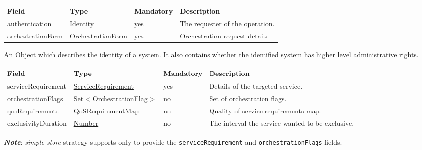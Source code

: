 \documentclass[a4paper]{arrowhead}
\newcommand{\pref}[1]{{\textcolor{ArrowheadGrey}{\hyperref[sec:model:primitives:#1]{#1}}}}
\begin{document}
{}
 
\begin{table}[ht!]
\begin{tabularx}{\textwidth}{| p{3.25cm} | p{3.5cm} | p{2cm} | X |} \hline
\rowcolor{gray!33} Field & Type & Mandatory & Description \\ \hline
authentication & \hyperref[sec:model:Identity]{Identity} & yes & The requester of the operation. \\ \hline
orchestrationForm & \hyperref[sec:model:OrchestrationForm]{OrchestrationForm} & yes & Orchestration request details. \\ \hline
\end{tabularx}
\end{table}


An \pref{Object} which describes the identity of a system. It also contains whether the identified system has higher level administrative rights.


\begin{table}[ht!]
\begin{tabularx}{\textwidth}{| p{3.25cm} | p{3.8cm} | p{2cm} | X |} \hline
\rowcolor{gray!33} Field & Type & Mandatory & Description \\ \hline
serviceRequirement & \hyperref[sec:model:ServiceRequirement]{ServiceRequirement} & yes & Details of the targeted service. \\ \hline
orchestrationFlags & \pref{Set}$<$\hyperref[sec:model:OrchestrationFlag]{OrchestrationFlag}$>$ & no & Set of orchestration flags. \\ \hline
qosRequirements & \hyperref[sec:model:QoSRequirementMap]{QoSRequirementMap} & no & Quality of service requirements map. \\ \hline
exclusivityDuration & \pref{Number} & no & The interval the service wanted to be exclusive.  \\ \hline
\end{tabularx}
\end{table}

\textbf{\textit{Note}}: \textit{simple-store} strategy supports only to provide the \texttt{serviceRequirement} and \texttt{orchestrationFlags} fields. 

\clearpage

\end{document}
